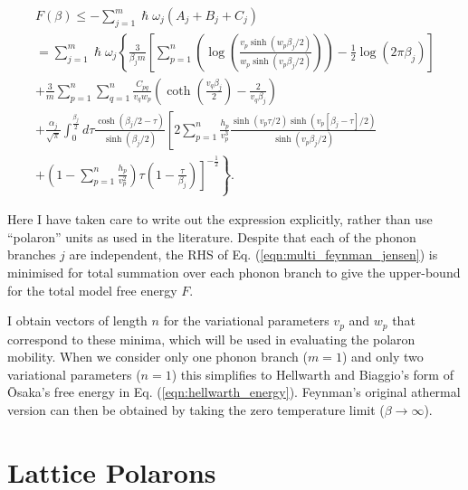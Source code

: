 \begin{equation} \label{eqn:multi_feynman_jensen}
    \begin{gathered}
         F(\beta) \leq -\sum_{j=1}^m \hslash \omega_j \left(A_j + B_j + C_j\right) \\ = \sum_{j=1}^m \hslash \omega_j \left\{ \frac{3}{\beta_j m} \left[ \sum_{p = 1}^n \left( \log\left(\frac{v_{p} \sinh (w_{p} \beta_j / 2)}{w_{p} \sinh (v_{p} \beta_j / 2)}\right) \right) - \frac{1}{2}\log \left(2\pi\beta_j\right) \right] \right. \\ \left. + \frac{3}{m}\sum_{p = 1}^n \sum_{q = 1}^n \frac{C_{pq}}{v_{q} w_{p}} \left( \coth \left(\frac{v_{q}\beta_j}{2}\right) - \frac{2}{v_{q}\beta_j}\right) \right. \\ 
        \left. + \frac{\alpha_j}{\sqrt{\pi}} \int_0^{\frac{\beta_j}{2}} d\tau \frac{\cosh(\beta_j/2 - \tau)}{\sinh(\beta_j/2)} \left[2 \sum_{p=1}^n \frac{h_{p}}{v_{p}^3} \frac{\sinh{(v_{p} \tau/2)\sinh{(v_{p}[\beta_j-\tau]/2)}}}{\sinh(v_{p}\beta_j/2)} \right. \right.\\
        \left. \left. + \left(1 - \sum_{p = 1}^n \frac{h_{p}}{v_{p}^2}\right) \tau \left(1 - \frac{\tau}{\beta_j}\right) \right]^{-\frac{1}{2}} \right\} .
    \end{gathered}
\end{equation}

Here I have taken care to write out the expression explicitly, rather than use ``polaron'' units as used in the literature. Despite that each of the phonon branches $j$ are independent, the RHS of Eq. (\ref{eqn:multi_feynman_jensen}) is minimised for total summation over each phonon branch to give the upper-bound for the total model free energy $F$. 

I obtain vectors of length $n$ for the variational parameters $v_{p}$ and $w_{p}$ that correspond to these minima, which will be used in evaluating the polaron mobility. When we consider only one phonon branch ($m = 1$) and only two variational parameters ($n = 1$) this simplifies to Hellwarth and Biaggio's form of \=Osaka's free energy in Eq. (\ref{eqn:hellwarth_energy}). Feynman's original athermal version can then be obtained by taking the zero temperature limit ($\beta \rightarrow \infty$).

\section{Lattice Polarons}
\label{sec:3-2}

